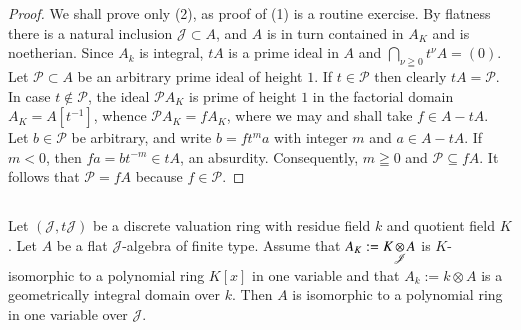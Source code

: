 \begin{proof}
We shall prove only (2), as proof of (1) is a routine exercise. By
flatness there is a natural inclusion $\mathscr{J}\subset A$, and $A$
is in turn contained in $A_{K}$ and is noetherian. Since $A_{k}$ is
integral, $tA$ is a prime ideal in $A$ and $\bigcap\limits_{\nu\geqq
  0}t^{\nu}A=(0)$. Let $\mathscr{P}\subset A$ be an arbitrary prime
ideal of height $1$. If $t\in\mathscr{P}$ then clearly
$tA=\mathscr{P}$. In case $t\not\in \mathscr{P}$, the ideal
$\mathscr{P}A_{K}$ is prime of height $1$ in the factorial domain
$A_{K}=A[t^{-1}]$, whence $\mathscr{P}A_{K}=fA_{K}$, where we may and
shall take $f\in A-tA$. Let $b\in\mathscr{P}$ be arbitrary, and write
$b=ft^{m}a$ with integer $m$ and $a\in A-tA$. If $m<0$, then
$fa=bt^{-m}\in tA$, an absurdity. Consequently, $m\geqq 0$ and
$\mathscr{P}\subseteq fA$. It follows that $\mathscr{P}=fA$ because
$f\in\mathscr{P}$.
\end{proof}

\subsection{}\label{chap1:4.3}
\begin{lemma*}
  Let $(\mathscr{J},t\mathscr{J})$ be a discrete valuation ring with
  residue field $k$ and quotient field $K$. Let $A$ be a flat
  $\mathscr{J}$-algebra of finite type. Assume that
  $A_{K}:=\foprod{K}{A}{\mathscr{J}}$ is $K$-isomorphic to a polynomial
  ring $K[x]$ in one variable and that $A_{k}:=k\otimes A$ is a
  geometrically integral domain over $k$. Then $A$ is isomorphic to a
  polynomial ring in one variable over $\mathscr{J}$. 
\end{lemma*}

